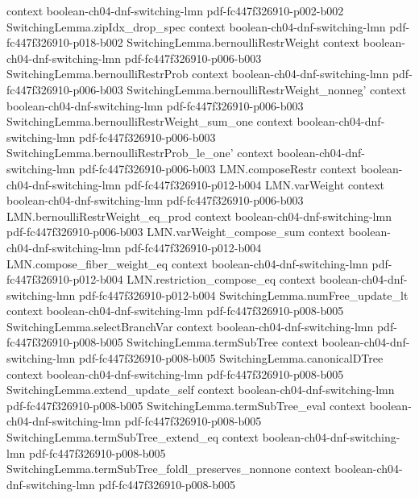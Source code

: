 \begin{theorem}
  {context}
  {boolean-ch04-dnf-switching-lmn}
  {pdf-fc447f326910-p002-b002}
\proofstep
  {SwitchingLemma.zipIdx_drop_spec}
  {context}
  {boolean-ch04-dnf-switching-lmn}
  {pdf-fc447f326910-p018-b002}
\proofstep
  {SwitchingLemma.bernoulliRestrWeight}
  {context}
  {boolean-ch04-dnf-switching-lmn}
  {pdf-fc447f326910-p006-b003}
\proofstep
  {SwitchingLemma.bernoulliRestrProb}
  {context}
  {boolean-ch04-dnf-switching-lmn}
  {pdf-fc447f326910-p006-b003}
\proofstep
  {SwitchingLemma.bernoulliRestrWeight_nonneg'}
  {context}
  {boolean-ch04-dnf-switching-lmn}
  {pdf-fc447f326910-p006-b003}
\proofstep
  {SwitchingLemma.bernoulliRestrWeight_sum_one}
  {context}
  {boolean-ch04-dnf-switching-lmn}
  {pdf-fc447f326910-p006-b003}
\proofstep
  {SwitchingLemma.bernoulliRestrProb_le_one'}
  {context}
  {boolean-ch04-dnf-switching-lmn}
  {pdf-fc447f326910-p006-b003}
\proofstep
  {LMN.composeRestr}
  {context}
  {boolean-ch04-dnf-switching-lmn}
  {pdf-fc447f326910-p012-b004}
\proofstep
  {LMN.varWeight}
  {context}
  {boolean-ch04-dnf-switching-lmn}
  {pdf-fc447f326910-p006-b003}
\proofstep
  {LMN.bernoulliRestrWeight_eq_prod}
  {context}
  {boolean-ch04-dnf-switching-lmn}
  {pdf-fc447f326910-p006-b003}
\proofstep
  {LMN.varWeight_compose_sum}
  {context}
  {boolean-ch04-dnf-switching-lmn}
  {pdf-fc447f326910-p012-b004}
\proofstep
  {LMN.compose_fiber_weight_eq}
  {context}
  {boolean-ch04-dnf-switching-lmn}
  {pdf-fc447f326910-p012-b004}
\proofstep
  {LMN.restriction_compose_eq}
  {context}
  {boolean-ch04-dnf-switching-lmn}
  {pdf-fc447f326910-p012-b004}
\proofstep
  {SwitchingLemma.numFree_update_lt}
  {context}
  {boolean-ch04-dnf-switching-lmn}
  {pdf-fc447f326910-p008-b005}
\proofstep
  {SwitchingLemma.selectBranchVar}
  {context}
  {boolean-ch04-dnf-switching-lmn}
  {pdf-fc447f326910-p008-b005}
\proofstep
  {SwitchingLemma.termSubTree}
  {context}
  {boolean-ch04-dnf-switching-lmn}
  {pdf-fc447f326910-p008-b005}
\proofstep
  {SwitchingLemma.canonicalDTree}
  {context}
  {boolean-ch04-dnf-switching-lmn}
  {pdf-fc447f326910-p008-b005}
\proofstep
  {SwitchingLemma.extend_update_self}
  {context}
  {boolean-ch04-dnf-switching-lmn}
  {pdf-fc447f326910-p008-b005}
\proofstep
  {SwitchingLemma.termSubTree_eval}
  {context}
  {boolean-ch04-dnf-switching-lmn}
  {pdf-fc447f326910-p008-b005}
\proofstep
  {SwitchingLemma.termSubTree_extend_eq}
  {context}
  {boolean-ch04-dnf-switching-lmn}
  {pdf-fc447f326910-p008-b005}
\proofstep
  {SwitchingLemma.termSubTree_foldl_preserves_nonnone}
  {context}
  {boolean-ch04-dnf-switching-lmn}
  {pdf-fc447f326910-p008-b005}
\proofstep

\end{theorem}
